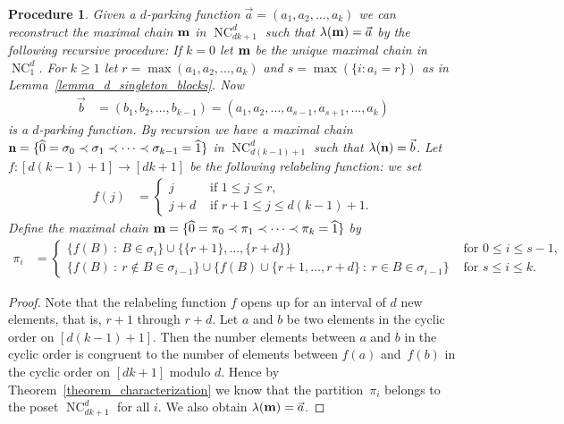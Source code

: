 \documentclass[11pt]{amsart}
\newtheorem{procedure}[theorem]{Procedure}
\numberwithin{equation}{section}
\newcommand{\hz}{\widehat{0}}
\newcommand{\ho}{\widehat{1}}
\newcommand{\coveredby}{\prec}
\DeclareMathOperator{\NC}{NC}
\begin{document}
\begin{procedure}
Given a $d$-parking function $\vec{a} = (a_{1}, a_{2}, \ldots, a_{k})$
we can reconstruct the maximal chain ${\bf m}$ in $\NC^{d}_{dk+1}$ such that
$\lambda({\bf m}) = \vec{a}$ by the following recursive procedure:
If $k=0$ let ${\bf m}$ be the unique maximal chain in $\NC^{d}_{1}$.
For $k \geq 1$
let $r =\max(a_{1}, a_{2}, \ldots, a_{k})$ and $s = \max(\{i : a_{i} = r\})$
as in Lemma~\ref{lemma_d_singleton_blocks}.
Now
\begin{align*}
\vec{b} & = (b_{1}, b_{2}, \ldots, b_{k-1}) = (a_{1}, a_{2}, \ldots, a_{s-1}, a_{s+1}, \ldots, a_{k})
\end{align*}
is a $d$-parking function.
By recursion we have a maximal chain
${\bf n} = \{\hz = \sigma_{0} \coveredby \sigma_{1} \coveredby \cdots \coveredby \sigma_{k-1} = \ho\}$
in $\NC^{d}_{d(k-1)+1}$
such that
$\lambda({\bf n}) = \vec{b}$.
Let $f : [d(k-1)+1] \longrightarrow[dk+1]$
be the following relabeling function: we set
\begin{align}
f(j)
& =
\begin{cases}
j     & \text{ if } 1    \leq j \leq r, \\
j+d & \text{ if } r+1 \leq j \leq d(k-1)+1.
\end{cases}
\label{equation_relabeling_function}
\end{align}
Define the maximal chain
${\bf m} = \{\hz = \pi_{0} \coveredby \pi_{1} \coveredby \cdots \coveredby \pi_{k} = \ho\}$
by 
\begin{align*}
\pi_{i}
& =
\begin{cases}
\{f(B) \: : \: B \in \sigma_{i}\} \cup \{\{r+1\}, \ldots, \{r+d\}\}
& \text{ for } 0 \leq i \leq s-1, \\
\{f(B) \: : \: r \notin B \in \sigma_{i-1}\}
\cup
\{f(B) \cup \{r+1, \ldots, r+d\} \: : \: r \in B \in \sigma_{i-1}\}
& \text{ for } s \leq i \leq k.
\end{cases}
\end{align*}
\label{procedure_reconstructing_maximal_chain}
\end{procedure}
\begin{proof}
Note that the relabeling function $f$ opens up for an interval of $d$ new elements,
that is, $r+1$ through $r+d$.
Let $a$ and $b$ be two elements in the cyclic order on $[d(k-1)+1]$.
Then the number elements between $a$ and $b$ in the cyclic order is congruent to the
number of elements between $f(a)$ and~$f(b)$ in the cyclic order on
$[dk+1]$ modulo $d$.
Hence by Theorem~\ref{theorem_characterization}
we know that the partition~$\pi_{i}$ belongs to the poset $\NC^{d}_{dk+1}$ for all $i$.
We also obtain $\lambda({\bf m}) = \vec{a}$.
\end{proof}
\end{document}
